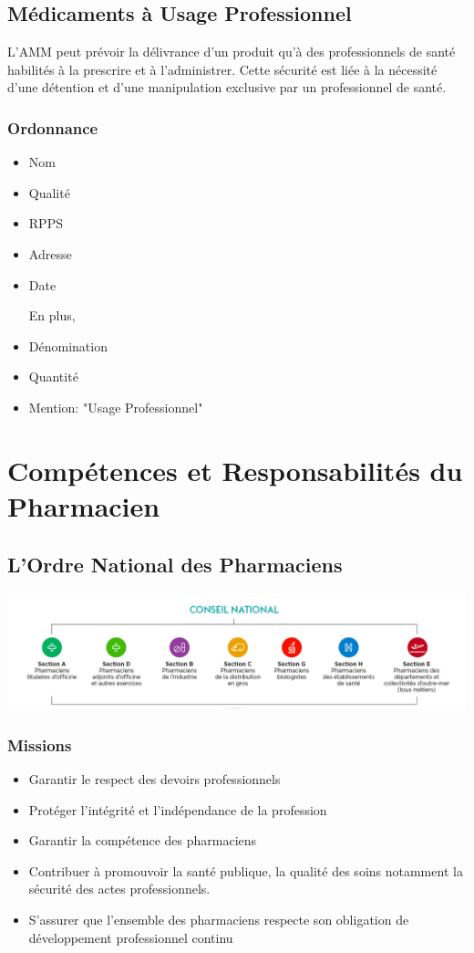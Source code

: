 \documentclass[11pt]{article}
\begin{document}
\subsection{Médicaments à Usage Professionnel}
\label{sec:org05e3478}
L'AMM peut prévoir la délivrance d'un produit qu'à des professionnels de santé habilités à la prescrire et à l'administrer. Cette sécurité est liée à la nécessité d'une détention et d'une manipulation exclusive par un professionnel de santé.

\subsubsection{Ordonnance}
\label{sec:org88839d3}
\begin{itemize}
\item Nom
\item Qualité
\item RPPS
\item Adresse
\item Date

En plus,
\item Dénomination
\item Quantité
\item Mention: "Usage Professionnel"
\end{itemize}
\section{Compétences et Responsabilités du Pharmacien}
\label{sec:org08ef6c9}
\setlength{\parindent}{0pt}
\subsection{L'Ordre National des Pharmaciens}
\label{sec:org3137de7}

\begin{center}
\includegraphics[width=.9\linewidth]{./ordre.png}
\end{center}
\subsubsection{Missions}
\label{sec:orgf32af6d}
\begin{itemize}
\item Garantir le respect des devoirs professionnels
\item Protéger l'intégrité et l'indépendance de la profession
\item Garantir la compétence des pharmaciens
\item Contribuer à promouvoir la santé publique, la qualité des soins notamment la sécurité des actes professionnels.
\item S'assurer que l'ensemble des pharmaciens respecte son obligation de développement professionnel continu
\end{itemize}
\end{document}
